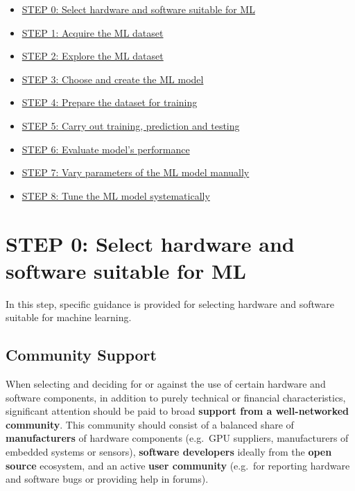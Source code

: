 \documentclass [oneside,10pt,a4paper,ngerman,BCOR10mm,headsepline,parindent,final]{scrartcl}
\providecommand{\tightlist}{%
      \setlength{\itemsep}{0pt}\setlength{\parskip}{0pt}}
\begin{document}
\begin{itemize}
\tightlist
\item
  \hyperref[step-0-select-hardware-and-software-suitable-for-ml]{STEP 0: Select hardware and software suitable for ML}
\item
  \hyperref[step-1-acquire-the-ml-dataset]{STEP 1: Acquire the ML dataset}
\item
  \hyperref[step-2-explore-the-ml-dataset]{STEP 2: Explore the ML dataset}
\item
  \hyperref[step-3-choose-and-create-the-ml-model]{STEP 3: Choose and create the ML model}
\item
  \hyperref[step-4-prepare-the-dataset-for-training]{STEP 4: Prepare the dataset for training}
\item
  \hyperref[step-5-carry-out-training-prediction-and-testing]{STEP 5: Carry out training, prediction and testing}
\item
  \hyperref[step-6-evaluate-models-performance]{STEP 6: Evaluate model’s performance}
\item
  \hyperref[step-7-vary-parameters-of-the-ml-model-manually]{STEP 7: Vary parameters of the ML model manually}
\item
  \hyperref[step-8-tune-the-ml-model-systematically]{STEP 8: Tune the ML model systematically}
\end{itemize}

    \hypertarget{step-0-select-hardware-and-software-suitable-for-ml}{%
\section{STEP 0: Select hardware and software suitable for
ML}\label{step-0-select-hardware-and-software-suitable-for-ml}}

In this step, specific guidance is provided for selecting hardware and
software suitable for machine learning.

    \hypertarget{community-support}{%
\subsection{Community Support}\label{community-support}}

When selecting and deciding for or against the use of certain hardware
and software components, in addition to purely technical or financial
characteristics, significant attention should be paid to broad
\textbf{support from a well-networked community}. This community should
consist of a balanced share of \textbf{manufacturers} of hardware
components (e.g.~GPU suppliers, manufacturers of embedded systems or
sensors), \textbf{software developers} ideally from the \textbf{open
source} ecosystem, and an active \textbf{user community} (e.g.~for
reporting hardware and software bugs or providing help in forums).
\end{document}
